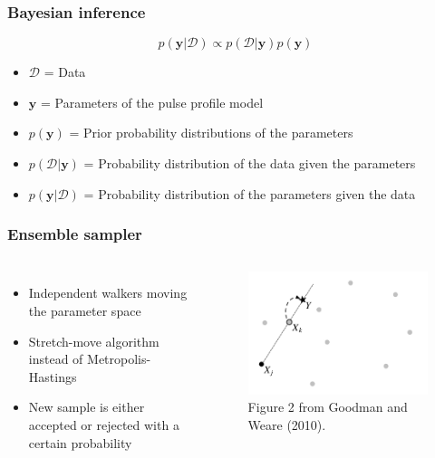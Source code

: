 \documentclass{beamer}
\def\be{\begin{equation}}
\def\ee{\end{equation}}
\begin{document}
\fi




\begin{frame}
\frametitle{Bayesian inference}

\be \label{eq:bayes}
p(\textbf{y}|\mathcal{D}) \propto p(\mathcal{D}|\textbf{y})p(\textbf{y})
\ee
\begin{itemize}
\item $\mathcal{D}$ = Data
\item $\textbf{y}$ = Parameters of the pulse profile model
\item $p(\textbf{y})$ = Prior probability distributions of the parameters
\item $p(\mathcal{D}|\textbf{y})$ = Probability distribution of the data given the parameters 
\item $p(\textbf{y}|\mathcal{D})$ = Probability distribution of the parameters given the data

\end{itemize}
\end{frame}





\begin{frame}
\frametitle{Ensemble sampler}
\begin{columns}[t] %
\begin{itemize}

\item Independent walkers moving the parameter space
\item Stretch-move algorithm instead of Metropolis-Hastings 
\item New sample is either accepted or rejected with a certain probability

\end{itemize}
\begin{figure}
\includegraphics[width=0.8\linewidth]{stretchmove.png}
\caption{Figure 2 from Goodman and Weare (2010).}
\end{figure}
\end{columns}
\end{frame}
\end{document}
